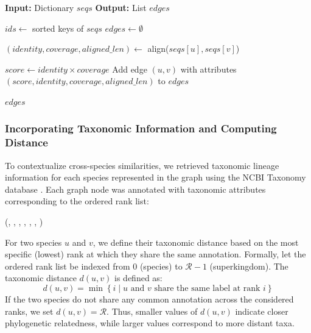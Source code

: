 \documentclass[11pt]{article}
\begin{document}
	\begin{algorithm}
		\caption{BuildEdgesFromAlignments}
		\begin{algorithmic}[1]
			\State \textbf{Input:} Dictionary $seqs$
			\State \textbf{Output:} List $edges$
			
			\State $ids \gets$ sorted keys of $seqs$
			\State $edges \gets \emptyset$
			
			\State $(identity, coverage, aligned\_len) \gets$ align($seqs[u], seqs[v]$)
			
			\State $score \gets identity \times coverage$
			\State Add edge $(u,v)$ with attributes $(score, identity, coverage, aligned\_len)$ to $edges$
			\EndIf
			\EndFor
			
			\State \Return $edges$
		\end{algorithmic}
		\label{algo1}
	\end{algorithm}
	
	\subsubsection[step 3]{Incorporating Taxonomic Information and Computing Distance}
	\label{subsubsec:step3}
	To contextualize cross-species similarities, we retrieved taxonomic lineage information for each species represented in the graph using the NCBI Taxonomy database \cite{NCBITaxonomy}.
	Each graph node was annotated with taxonomic attributes corresponding to the ordered rank list:
	\begin{center}
		(, , , , , , )
	\end{center}
	For two species $u$ and $v$, we define their taxonomic distance based on the most specific (lowest) rank at which they share the same annotation.  
	Formally, let the ordered rank list be indexed from $0$ (species) to $\mathcal{R}-1$ (superkingdom).  
	The taxonomic distance $d(u,v)$ is defined as:
	{\setlength{\abovedisplayskip}{4pt}
		\setlength{\belowdisplayskip}{4pt}
		\begin{equation*}
			d(u,v) = \min\left\{ i \mid \text{$u$ and $v$ share the same label at rank } i \right\}
		\end{equation*}
	}
	\noindent
	If the two species do not share any common annotation across the considered ranks, we set $d(u,v) = \mathcal{R}$. Thus, smaller values of $d(u,v)$ indicate closer phylogenetic relatedness, while larger values correspond to more distant taxa.
	
\end{document}
